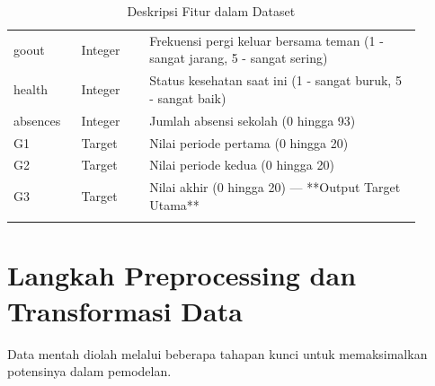 \begin{longtable}{|p{0.15\linewidth}|p{0.15\linewidth}|p{0.6\linewidth}|}
    goout & Integer & Frekuensi pergi keluar bersama teman (1 - sangat jarang, 5 - sangat sering) \\
    health & Integer & Status kesehatan saat ini (1 - sangat buruk, 5 - sangat baik) \\
    absences & Integer & Jumlah absensi sekolah (0 hingga 93) \\
    G1 & Target & Nilai periode pertama (0 hingga 20) \\
    G2 & Target & Nilai periode kedua (0 hingga 20) \\
    G3 & Target & Nilai akhir (0 hingga 20) --- **Output Target Utama** \\
    \hline
    \caption{Deskripsi Fitur dalam Dataset}
\end{longtable}

\section{Langkah Preprocessing dan Transformasi Data}
Data mentah diolah melalui beberapa tahapan kunci untuk memaksimalkan potensinya dalam pemodelan.

